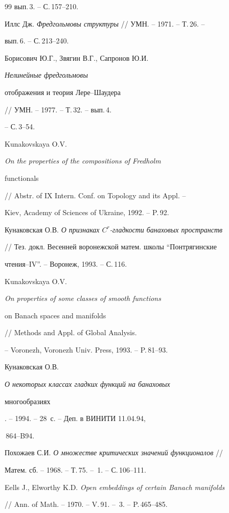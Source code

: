 \begin{thebibliography}{99}
вып.\,3. -- С.\,157--210.




Иллс Дж. {\em Фредгольмовы структуры} // УМН. -- 1971. -- Т.\,26. --


вып.\,6. -- С.\,213--240.




Борисович Ю.Г., Звягин В.Г., Сапронов Ю.И. {\em Нелинейные фредгольмовы


отображения и теория Лере--Шаудера} // УМН. -- 1977. -- Т.\,32. -- вып.\,4.


-- С.\,3--54.




Kunakovskaya O.V. {\em On the properties of the compositions of Fredholm


functionals} // Abstr. of IX Intern. Conf. on Topology and its Appl. --


Kiev, Academy of Sciences of Ukraine, 1992. -- P.\,92.




Кунаковская О.В. {\em О признаках $C^r$-гладкости банаховых пространств}


// Тез. докл. Весенней воронежской матем. школы ``Понтрягинские


чтения--IV''. -- Воронеж, 1993. -- С.\,116.




Kunakovskaya O.V. {\em On properties of some classes of smooth functions


on Banach spaces and manifolds} // Methods and Appl. of Global Analysis.


-- Voronezh, Voronezh Univ. Press, 1993. -- P.\,81--93.




Кунаковская О.В. {\em О некоторых классах гладких функций на банаховых


многообразиях}. -- 1994. -- 28~с. -- Деп. в ВИНИТИ 11.04.94,


\No\,864--B94.




Похожаев С.И. {\em О множестве критических значений функционалов} //


Матем. сб. -- 1968. -- Т.\,75. -- \No\,1. -- С.\,106--111.




Eells J., Elworthy K.D. {\em Open embeddings of certain Banach manifolds}


// Ann. of Math. -- 1970. -- V.\,91. -- \No\,3. -- P.\,465--485.



\end{thebibliography}
